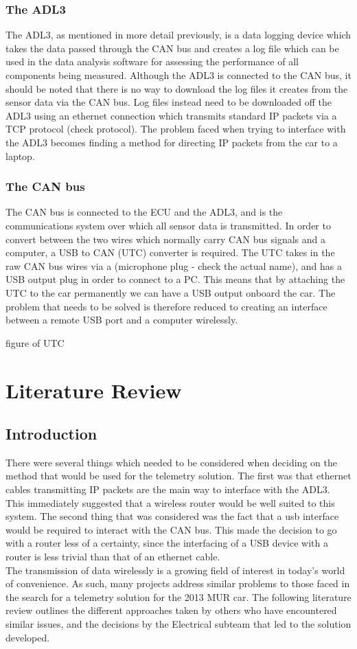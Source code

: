 \subsubsection{The ADL3}
The ADL3, as mentioned in more detail previously, is a data logging device which takes the data passed through the CAN bus and creates a log file which can be used in the data analysis software for assessing the performance of all components being measured. Although the ADL3 is connected to the CAN bus, it should be noted that there is no way to download the log files it creates from the sensor data via the CAN bus. Log files instead need to be downloaded off the ADL3 using an ethernet connection which transmits standard IP packets via a TCP protocol (check protocol). The problem faced when trying to interface with the ADL3 becomes finding a method for directing IP packets from the car to a laptop.

\subsubsection{The CAN bus}
The CAN bus is connected to the ECU and the ADL3, and is the communications system over which all sensor data is transmitted. In order to convert between the two wires which normally carry CAN bus signals and a computer, a USB to CAN (UTC) converter is required. The UTC takes in the raw CAN bus wires via a (microphone plug - check the actual name), and has a USB output plug in order to connect to a PC. This means that by attaching the UTC to the car permanently we can have a USB output onboard the car. The problem that needs to be solved is therefore reduced to creating an interface between a remote USB port and a computer wirelessly.

figure of UTC

\section{Literature Review}
\subsection{Introduction}
There were several things which needed to be considered when deciding on the method that would be used for the telemetry solution. The first was that ethernet cables transmitting IP packets are the main way to interface with the ADL3. This immediately suggested that a wireless router would be well suited to this system. The second thing that was considered was the fact that a usb interface would be required to interact with the CAN bus. This made the decision to go with a router less of a certainty, since the interfacing of a USB device with a router is less trivial than that of an ethernet cable.\\ 
The transmission of data wirelessly is a growing field of interest in today's world of convenience. As such, many projects address similar problems to those faced in the search for a telemetry solution for the 2013 MUR car. The following literature review outlines the different approaches taken by others who have encountered similar issues, and the decisions by the Electrical subteam that led to the solution developed.

